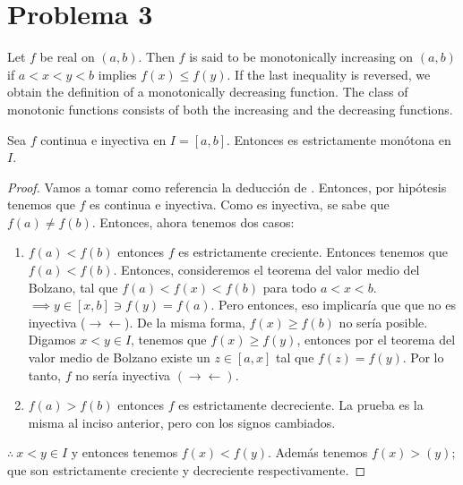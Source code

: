 \section{Problema 3}
\begin{tcolorbox}[colback=blue!15,colframe=blue!1!blue,title=Definición 4.28 (Funciones monótonas) de \cite{rudin1976principles}]
	Let $f$ be real on $(a, b)$. Then $f$ is said to be monotonically increasing on $(a, b)$ if $a<x<y<b$ implies $f(x) \leq f(y)$. If the last inequality is reversed, we obtain the definition of a monotonically decreasing function. The class of monotonic functions consists of both the increasing and the decreasing functions.
\end{tcolorbox}

\begin{tcolorbox}[colback=gray!15,colframe=gray!1!gray,title=Teorema 1 (Fue dejado como tarea demostrarlo)]
	Sea $f$ continua e inyectiva en $I=[a,b]$. Entonces es estrictamente monótona en $I$. 
	\begin{proof}
		Vamos a tomar como referencia la deducción de \cite{walker2012examples}. Entonces, por hipótesis tenemos que $f$ es continua e inyectiva. Como es inyectiva, se sabe que $f(a)\neq f(b)$. Entonces, ahora tenemos dos casos: 
		\begin{enumerate}
			\item $f(a)<f(b)$ entonces $f$ es estrictamente creciente. Entonces tenemos que $f(a)<f(b)$. Entonces, consideremos el teorema del valor medio del Bolzano, tal que $f(a)<f(x)<f(b)$ para todo $a<x<b$. $\implies y\in [x,b]\ni f(y)=f(a)$. Pero entonces, eso implicaría que que no es inyectiva ($\to \gets$).  De la misma forma, $f(x)\geq f(b)$ no sería posible. Digamos $x<y\in I$, tenemos que $f(x)\geq f(y)$, entonces por el teorema del valor medio de Bolzano existe un $z\in [a,x]$ tal que $f(z)=f(y)$. Por lo tanto, $f$ no sería inyectiva $(\to\gets)$. 
			\item $f(a)>f(b)$ entonces $f$ es estrictamente decreciente. La prueba es la misma al inciso anterior, pero con los signos cambiados. 
		\end{enumerate}
	$\therefore\ x<y \in I $ y entonces tenemos $f(x)<f(y)$. Además tenemos $f(x)>(y)$; que son estrictamente creciente y  decreciente respectivamente.   
	\end{proof}
\end{tcolorbox}


